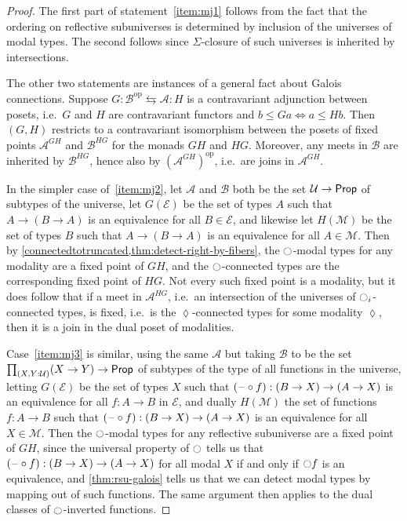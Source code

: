 \begin{proof}
  The first part of statement~\ref{item:mj1} follows from the fact that the ordering on reflective subuniverses is determined by inclusion of the universes of modal types.
  The second follows since $\Sigma$-closure of such universes is inherited by intersections.

  The other two statements are instances of a general fact about Galois connections.
  Suppose $G: \mathcal{B}^{\mathrm{op}} \leftrightarrows \mathcal{A} : H$ is a contravariant adjunction between posets, i.e.\ $G$ and $H$ are contravariant functors and $b \le G a \iff a \le H b$.
  Then $(G,H)$ restricts to a contravariant isomorphism between the posets of fixed points $\mathcal{A}^{GH}$ and $\mathcal{B}^{HG}$ for the monads $G H$ and $H G$.
  Moreover, any meets in $\mathcal{B}$ are inherited by $\mathcal{B}^{HG}$, hence also by $(\mathcal{A}^{GH})^{\mathrm{op}}$, i.e.\ are joins in $\mathcal{A}^{GH}$.

  In the simpler case of~\ref{item:mj2}, let $\mathcal{A}$ and $\mathcal{B}$ both be the set $\mathcal{U} \to \mathsf{Prop}$ of subtypes of the universe, let $G(\mathcal{E})$ be the set of types $A$ such that $A \to (B\to A)$ is an equivalence for all $B\in \mathcal{E}$, and likewise let $H(\mathcal{M})$ be the set of types $B$ such that $A \to (B\to A)$ is an equivalence for all $A\in \mathcal{M}$.
  Then by \cref{connectedtotruncated,thm:detect-right-by-fibers}, the ${\ocircle}$-modal types for any modality are a fixed point of $GH$, and the ${\ocircle}$-connected types are the corresponding fixed point of $HG$.
  Not every such fixed point is a modality, but it does follow that if a meet in $\mathcal{A}^{HG}$, i.e.\ an intersection of the universes of ${\ocircle}_i$-connected types, is fixed, i.e.\ is the $\lozenge$-connected types for some modality $\lozenge$, then it is a join in the dual poset of modalities.

  Case~\ref{item:mj3} is similar, using the same $\mathcal{A}$ but taking $\mathcal{B}$ to be the set $\prd{X,Y:\UU} (X\to Y) \to \prop$ of subtypes of the type of all functions in the universe, letting $G(\mathcal{E})$ be the set of types $X$ such that $(\mathord{\hspace{1pt}\text{--}\hspace{1pt}}\circ f) : (B\to X) \to (A\to X)$ is an equivalence for all $f:A\to B$ in $\mathcal{E}$, and dually $H(\mathcal{M})$ the set of functions $f:A\to B$ such that $(\mathord{\hspace{1pt}\text{--}\hspace{1pt}}\circ f) : (B\to X) \to (A\to X)$ is an equivalence for all $X\in \mathcal{M}$.
  Then the ${\ocircle}$-modal types for any reflective subuniverse are a fixed point of $GH$, since the universal property of ${\ocircle}$ tells us that $(\mathord{\hspace{1pt}\text{--}\hspace{1pt}}\circ f) : (B\to X) \to (A\to X)$ for all modal $X$ if and only if ${\ocircle} f$ is an equivalence, and \cref{thm:rsu-galois} tells us that we can detect modal types by mapping out of such functions.
  The same argument then applies to the dual classes of ${\ocircle}$-inverted functions.
\end{proof}

